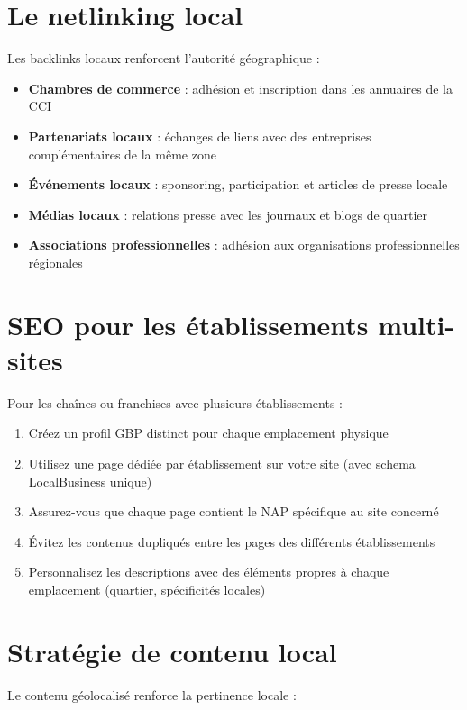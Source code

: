 \documentclass[12pt,a4paper,twoside]{report}
\begin{document}
\section{Le netlinking local}

Les backlinks locaux renforcent l'autorité géographique :

\begin{itemize}
    \item \textbf{Chambres de commerce} : adhésion et inscription dans les annuaires de la CCI
    \item \textbf{Partenariats locaux} : échanges de liens avec des entreprises complémentaires de la même zone
    \item \textbf{Événements locaux} : sponsoring, participation et articles de presse locale
    \item \textbf{Médias locaux} : relations presse avec les journaux et blogs de quartier
    \item \textbf{Associations professionnelles} : adhésion aux organisations professionnelles régionales
\end{itemize}

\section{SEO pour les établissements multi-sites}

Pour les chaînes ou franchises avec plusieurs établissements :

\begin{enumerate}
    \item Créez un profil GBP distinct pour chaque emplacement physique
    \item Utilisez une page dédiée par établissement sur votre site (avec schema LocalBusiness unique)
    \item Assurez-vous que chaque page contient le NAP spécifique au site concerné
    \item Évitez les contenus dupliqués entre les pages des différents établissements
    \item Personnalisez les descriptions avec des éléments propres à chaque emplacement (quartier, spécificités locales)
\end{enumerate}

\section{Stratégie de contenu local}

Le contenu géolocalisé renforce la pertinence locale :
\end{document}
